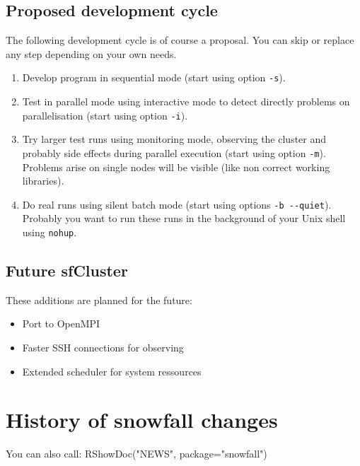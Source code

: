 \documentclass[10pt,oneside]{article}
\begin{document}
\subsection{Proposed development cycle}
The following development cycle is of course a proposal. You can skip
or replace any step depending on your own needs.

\begin{enumerate}
\item
Develop program in sequential mode (start using option \texttt{-s}).
\item
Test in parallel mode using interactive mode to detect directly problems
on parallelisation (start using option \texttt{-i}).
\item
Try larger test runs using monitoring mode, observing the cluster and
probably side effects during parallel execution
(start using option \texttt{-m}). Problems arise on single nodes
will be visible (like non correct working libraries).
\item
Do real runs using silent batch mode (start using options
\texttt{-b {-}{-}quiet}). Probably you want to run these runs in the
background of your Unix shell using \texttt{nohup}.
\end{enumerate}

\subsection{Future sfCluster}

These additions are planned for the future:

\begin{itemize}
\item Port to OpenMPI
\item Faster SSH connections for observing
\item Extended scheduler for system ressources
\end{itemize}

\section{History of snowfall changes}
You can also call: RShowDoc("NEWS", package="snowfall")
\end{document}
